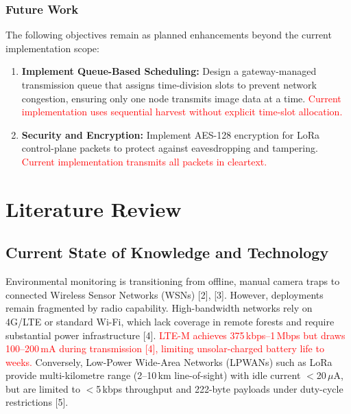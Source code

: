 \documentclass[12pt,a4paper]{article}
\newcommand{\changed}[1]{\textcolor{red}{#1}}
\begin{document}
\subsubsection{Future Work}

The following objectives remain as planned enhancements beyond the current implementation scope:

\begin{enumerate}
    \item \textbf{Implement Queue-Based Scheduling:} Design a gateway-managed transmission queue that assigns time-division slots to prevent network congestion, ensuring only one node transmits image data at a time. \changed{Current implementation uses sequential harvest without explicit time-slot allocation.}

    \item \textbf{Security and Encryption:} Implement AES-128 encryption for LoRa control-plane packets to protect against eavesdropping and tampering. \changed{Current implementation transmits all packets in cleartext.}
\end{enumerate}

\newpage


\section{Literature Review}

\subsection{Current State of Knowledge and Technology}

Environmental monitoring is transitioning from offline, manual camera traps to connected Wireless Sensor Networks (WSNs) [2], [3]. However, deployments remain fragmented by radio capability. High-bandwidth networks rely on 4G/LTE or standard Wi-Fi, which lack coverage in remote forests and require substantial power infrastructure [4]. \changed{LTE-M achieves 375\,kbps--1\,Mbps but draws 100--200\,mA during transmission [4], limiting unsolar-charged battery life to weeks.} Conversely, Low-Power Wide-Area Networks (LPWANs) such as LoRa provide multi-kilometre range (2--10\,km line-of-sight) with idle current $<$20\,$\mu$A, but are limited to $<$5\,kbps throughput and 222-byte payloads under duty-cycle restrictions [5].
\end{document}
